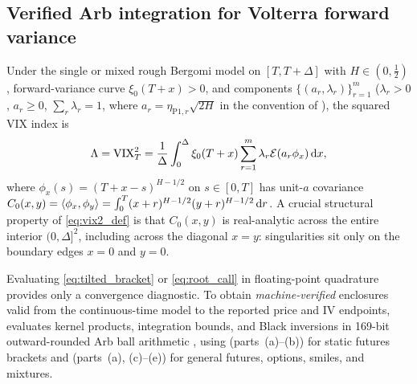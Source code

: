 \subsection{Verified Arb integration for Volterra forward variance}\label{sec:arb_theory}
Under the single or mixed rough Bergomi model on $[T,T+\Delta]$ with $H\in(0,\tfrac12)$, forward-variance
curve $\xi_0(T+x)>0$, and components $\{(a_r,\lambda_r)\}_{r=1}^m$ ($\lambda_r>0$, $a_r\ge0$, $\sum_r\lambda_r=1$,
where $a_r=\eta_{\mathrm{P1},r}\sqrt{2H}$ in the convention of \citealp{BayerFrizGatheral2016}), the
squared VIX index is
\begin{equation}\label{eq:vix2_def}
  \Lambda=\mathrm{VIX}_T^2=\frac{1}{\Delta}\int_0^\Delta \xi_0(T+x)\sum_{r=1}^m\lambda_r\mathcal{E}(a_r\phi_x)\,\mathrm{d} x,
\end{equation}
where $\phi_x(s)=(T+x-s)^{H-1/2}$ on $s\in[0,T]$ has unit-$a$ covariance
$C_0(x,y)=\left\langle \phi_x,\phi_y\right\rangle=\int_0^T(x+r)^{H-1/2}(y+r)^{H-1/2}\,\mathrm{d} r$. A crucial structural property of
\eqref{eq:vix2_def} is that $C_0(x,y)$ is real-analytic across the entire interior $(0,\Delta]^2$,
including across the diagonal $x=y$: singularities sit only on the boundary edges $x=0$ and $y=0$.

Evaluating \eqref{eq:tilted_bracket} or \eqref{eq:root_call} in floating-point quadrature provides only a
convergence diagnostic. To obtain \emph{machine-verified} enclosures valid from the continuous-time model
to the reported price and IV endpoints, \RoughCert{} evaluates kernel products, integration bounds, and
Black inversions in 169-bit outward-rounded Arb ball arithmetic \citep{Johansson2017,Johansson2018},
using \RoughCertTilt{} (parts~(a)--(b)) for static futures brackets and \RoughCertCV{} (parts~(a), (c)--(e))
for general futures, options, smiles, and mixtures.

